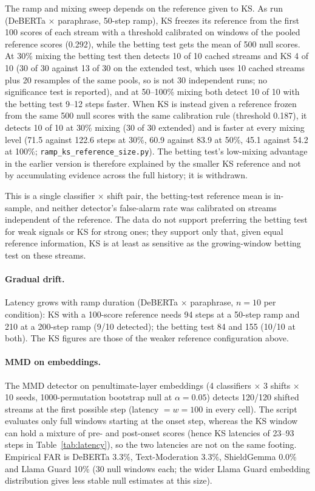 \documentclass{article}
\begin{document}
The ramp and mixing sweep depends on the reference given to KS. As run (DeBERTa $\times$ paraphrase, 50-step ramp), KS freezes its reference from the first 100 scores of each stream with a threshold calibrated on windows of the pooled reference scores (0.292), while the betting test gets the mean of 500 null scores. At 30\% mixing the betting test then detects 10 of 10 cached streams and KS 4 of 10 (30 of 30 against 13 of 30 on the extended test, which uses 10 cached streams plus 20 resamples of the same pools, so is not 30 independent runs; no significance test is reported), and at 50--100\% mixing both detect 10 of 10 with the betting test 9--12 steps faster. When KS is instead given a reference frozen from the same 500 null scores with the same calibration rule (threshold 0.187), it detects 10 of 10 at 30\% mixing (30 of 30 extended) and is faster at every mixing level (71.5 against 122.6 steps at 30\%, 60.9 against 83.9 at 50\%, 45.1 against 54.2 at 100\%; \texttt{ramp\_ks\_reference\_size.py}). The betting test's low-mixing advantage in the earlier version is therefore explained by the smaller KS reference and not by accumulating evidence across the full history; it is withdrawn.

This is a single classifier $\times$ shift pair, the betting-test reference mean is in-sample, and neither detector's false-alarm rate was calibrated on streams independent of the reference. The data do not support preferring the betting test for weak signals or KS for strong ones; they support only that, given equal reference information, KS is at least as sensitive as the growing-window betting test on these streams.

\paragraph{Gradual drift.} Latency grows with ramp duration (DeBERTa $\times$ paraphrase, $n{=}10$ per condition): KS with a 100-score reference needs 94 steps at a 50-step ramp and 210 at a 200-step ramp (9/10 detected); the betting test 84 and 155 (10/10 at both). The KS figures are those of the weaker reference configuration above.

\paragraph{MMD on embeddings.} The MMD detector on penultimate-layer embeddings (4 classifiers $\times$ 3 shifts $\times$ 10 seeds, 1000-permutation bootstrap null at $\alpha{=}0.05$) detects 120/120 shifted streams at the first possible step (latency $= w{=}100$ in every cell). The script evaluates only full windows starting at the onset step, whereas the KS window can hold a mixture of pre- and post-onset scores (hence KS latencies of 23--93 steps in Table~\ref{tab:latency}), so the two latencies are not on the same footing. Empirical FAR is DeBERTa 3.3\%, Text-Moderation 3.3\%, ShieldGemma 0.0\% and Llama Guard 10\% (30 null windows each; the wider Llama Guard embedding distribution gives less stable null estimates at this size).
\end{document}
